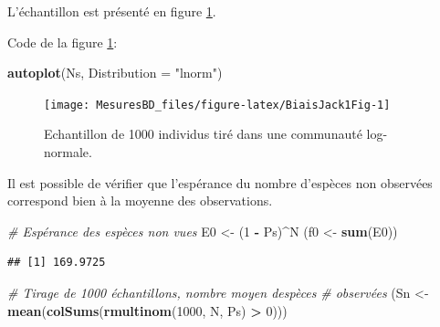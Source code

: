 \documentclass[
  11pt,
  french,
  a4paper,
  extrafontsizes,onecolumn,openright
  ]{memoir}
\newenvironment{Shaded}{\begin{snugshade}}{\end{snugshade}}
\newcommand{\AttributeTok}[1]{\textcolor[rgb]{0.13,0.29,0.53}{#1}}
\newcommand{\CommentTok}[1]{\textcolor[rgb]{0.56,0.35,0.01}{\textit{#1}}}
\newcommand{\DecValTok}[1]{\textcolor[rgb]{0.00,0.00,0.81}{#1}}
\newcommand{\FunctionTok}[1]{\textcolor[rgb]{0.13,0.29,0.53}{\textbf{#1}}}
\newcommand{\NormalTok}[1]{#1}
\newcommand{\OtherTok}[1]{\textcolor[rgb]{0.56,0.35,0.01}{#1}}
\newcommand{\SpecialCharTok}[1]{\textcolor[rgb]{0.81,0.36,0.00}{\textbf{#1}}}
\newcommand{\StringTok}[1]{\textcolor[rgb]{0.31,0.60,0.02}{#1}}
\begin{document}
L'échantillon est présenté en figure \ref{fig:BiaisJack1Fig}.

Code de la figure \ref{fig:BiaisJack1Fig}:

\scriptsize

\begin{Shaded}
\begin{Highlighting}[]
\FunctionTok{autoplot}\NormalTok{(Ns, }\AttributeTok{Distribution =} \StringTok{"lnorm"}\NormalTok{)}
\end{Highlighting}
\end{Shaded}

\normalsize

\scriptsize

\begin{figure}

{\centering \texttt{[image: MesuresBD\_files/figure-latex/BiaisJack1Fig-1]} 

}

\caption{Echantillon de 1000 individus tiré dans une communauté log-normale.}\label{fig:BiaisJack1Fig}
\end{figure}

\normalsize

Il est possible de vérifier que l'espérance du nombre d'espèces non observées correspond bien à la moyenne des observations.

\scriptsize

\begin{Shaded}
\begin{Highlighting}[]
\CommentTok{\# Espérance des espèces non vues}
\NormalTok{E0 }\OtherTok{\textless{}{-}}\NormalTok{ (}\DecValTok{1} \SpecialCharTok{{-}}\NormalTok{ Ps)}\SpecialCharTok{\^{}}\NormalTok{N}
\NormalTok{(f0 }\OtherTok{\textless{}{-}} \FunctionTok{sum}\NormalTok{(E0))}
\end{Highlighting}
\end{Shaded}

\begin{verbatim}
## [1] 169.9725
\end{verbatim}

\begin{Shaded}
\begin{Highlighting}[]
\CommentTok{\# Tirage de 1000 échantillons, nombre moyen d\textquotesingle{}espèces}
\CommentTok{\# observées}
\NormalTok{(Sn }\OtherTok{\textless{}{-}} \FunctionTok{mean}\NormalTok{(}\FunctionTok{colSums}\NormalTok{(}\FunctionTok{rmultinom}\NormalTok{(}\DecValTok{1000}\NormalTok{, N, Ps) }\SpecialCharTok{\textgreater{}} \DecValTok{0}\NormalTok{)))}
\end{Highlighting}
\end{Shaded}
\end{document}
